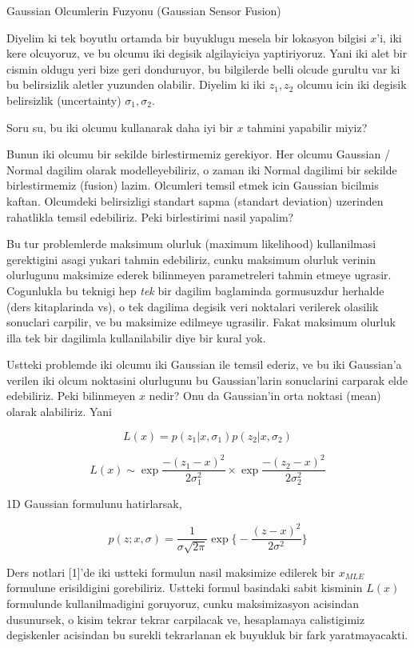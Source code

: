 \documentclass[12pt,fleqn]{article}\usepackage{../common}
\begin{document}
Gaussian Olcumlerin Fuzyonu (Gaussian Sensor Fusion)

Diyelim ki tek boyutlu ortamda bir buyuklugu mesela bir lokasyon bilgisi
$x$'i, iki kere olcuyoruz, ve bu olcumu iki degisik algilayiciya
yaptiriyoruz. Yani iki alet bir cismin oldugu yeri bize geri donduruyor, bu
bilgilerde belli olcude gurultu var ki bu belirsizlik aletler yuzunden
olabilir. Diyelim ki iki $z_1,z_2$ olcumu icin iki degisik belirsizlik
(uncertainty) $\sigma_1,\sigma_2$. 

Soru su, bu iki olcumu kullanarak daha iyi bir $x$ tahmini yapabilir miyiz?

Bunun iki olcumu bir sekilde birlestirmemiz gerekiyor. Her olcumu Gaussian
/ Normal dagilim olarak modelleyebiliriz, o zaman iki Normal dagilimi bir
sekilde birlestirmemiz (fusion) lazim. Olcumleri temsil etmek icin Gaussian
bicilmis kaftan. Olcumdeki belirsizligi standart sapma (standart deviation)
uzerinden rahatlikla temsil edebiliriz. Peki birlestirimi nasil yapalim? 

Bu tur problemlerde maksimum olurluk (maximum likelihood) kullanilmasi
gerektigini asagi yukari tahmin edebiliriz, cunku maksimum olurluk verinin
olurlugunu maksimize ederek bilinmeyen parametreleri tahmin etmeye
ugrasir. Cogunlukla bu teknigi hep {\em tek} bir dagilim baglaminda
gormusuzdur herhalde (ders kitaplarinda vs), o tek dagilima degisik veri
noktalari verilerek olasilik sonuclari carpilir, ve bu maksimize edilmeye
ugrasilir. Fakat maksimum olurluk illa tek bir dagilimla kullanilabilir
diye bir kural yok. 

Ustteki problemde iki olcumu iki Gaussian ile temsil ederiz, ve bu iki
Gaussian'a verilen iki olcum noktasini olurlugunu bu Gaussian'larin
sonuclarini carparak elde edebiliriz. Peki bilinmeyen $x$ nedir? Onu da
Gaussian'in orta noktasi (mean) olarak alabiliriz. Yani

$$ L(x) = p(z_1|x,\sigma_1) p(z_2|x,\sigma_2) $$

$$ L(x) \sim \exp{\frac{-(z_1-x)^2}{2\sigma_1^2} } 
\times \exp \frac{-(z_2-x)^2}{2\sigma_2^2} $$

1D Gaussian formulunu hatirlarsak, 

$$ p(z;x,\sigma) = \frac{1}{\sigma\sqrt{2\pi}} 
\exp \bigg\{ - \frac{(z-x)^2}{2\sigma^2}  \bigg\}
 $$

Ders notlari [1]'de iki ustteki formulun nasil maksimize edilerek bir
$x_{MLE}$ formulune erisildigini gorebiliriz. Ustteki formul basindaki
sabit kisminin $L(x)$ formulunde kullanilmadigini goruyoruz, cunku
maksimizasyon acisindan dusunursek, o kisim tekrar tekrar carpilacak ve,
hesaplamaya calistigimiz degiskenler acisindan bu surekli tekrarlanan ek
buyukluk bir fark yaratmayacakti.
\end{document}
